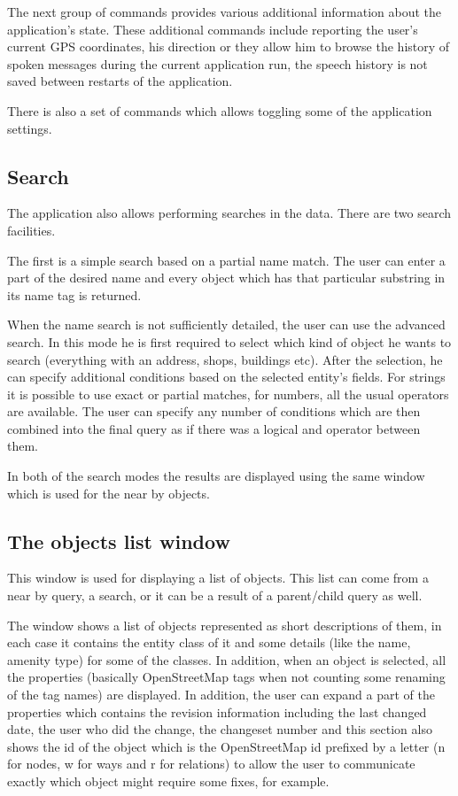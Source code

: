 \documentclass[nolof,digital]{fithesis3}
\begin{document}
The next group of commands provides various additional information about the application's state. These additional commands include reporting the user's current GPS coordinates, his direction or they allow him to browse the history of spoken messages during the current application run, the speech history is not saved between restarts of the application.

There is also a set of commands which allows toggling some of the application settings.
\subsection{Search}
The application also allows performing searches in the data. There are two search facilities.

The first is a simple search based on a partial name match. The user can enter a part of the desired name and every object which has that particular substring in its name tag is returned.

When the name search is not sufficiently detailed, the user can use the advanced search. In this mode he is first required to select which kind of object he wants to search (everything with an address, shops, buildings etc). After the selection, he can specify additional conditions based on the selected entity's fields. For strings it is possible to use exact or partial matches, for numbers, all the usual operators are available. The user can specify any number of conditions which are then combined into the final query as if there was a logical and operator between them.

In both of the search modes the results are displayed using the same window which is used for the near by objects.
\subsection{The objects list window}
This window is used for displaying a list of objects. This list can come from a near by query, a search, or it can be a result of a parent/child query as well.

The window shows a list of objects represented as short descriptions of them, in each case it contains the entity class of it and some details (like the name, amenity type) for some of the classes. In addition, when an object is selected, all the properties (basically OpenStreetMap tags when not counting some renaming of the tag names) are displayed. In addition, the user can expand a part of the properties which contains the revision information including the last changed date, the user who did the change, the changeset number and this section also shows the id of the object which is the OpenStreetMap id prefixed by a letter (n for nodes, w for ways and r for relations) to allow the user to communicate exactly which object might require some fixes, for example.
\end{document}
